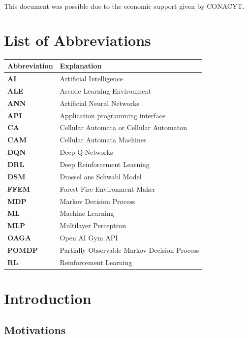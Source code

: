 \documentclass[
  12pt,
  openany]{book}
\begin{document}
\begin{flushright}
\footnotesize{This document was possible due to the economic support given by CONACYT.}
\end{flushright}

\tableofcontents

\listoffigures

\listoftables

\hypertarget{list-of-abbreviations}{%
\chapter*{List of Abbreviations}\label{list-of-abbreviations}}

\begin{tabular}{>{\bfseries}ll}
\toprule
Abbreviation & Explanation\\
\midrule
AI & Artificial Intelligence\\
ALE & Arcade Learning Environment\\
ANN & Artificial Neural Networks\\
API & Application programming interface\\
CA & Cellular Automata or Cellular Automaton\\
\addlinespace
CAM & Cellular Automata Machines\\
DQN & Deep Q-Networks\\
DRL & Deep Reinforcement Learning\\
DSM & Drossel ans Schwabl Model\\
FFEM & Forest Fire Environment Maker\\
\addlinespace
MDP & Markov Decision Process\\
ML & Machine Learning\\
MLP & Multilayer Perceptron\\
OAGA & Open AI Gym API\\
POMDP & Partially Observable Markov Decision Process\\
\addlinespace
RL & Reinforcement Learning\\
\bottomrule
\end{tabular}

\hypertarget{introduction}{%
\chapter{Introduction}\label{introduction}}

\hypertarget{motivations}{%
\section{Motivations}\label{motivations}}
\end{document}
